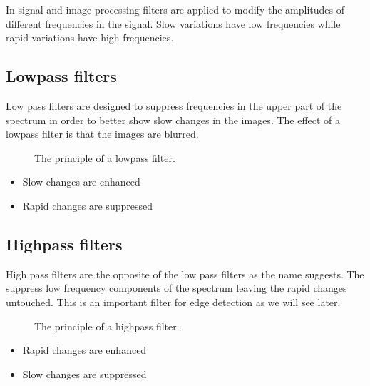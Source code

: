 \documentclass[letterpaper,10pt,english]{sphinxmanual}
\begin{document}
\sphinxAtStartPar
In signal and image processing filters are applied to modify the amplitudes of different frequencies in the signal. Slow variations have low frequencies while rapid variations have high frequencies.


\subsection{Low\sphinxhyphen{}pass filters}
\label{\detokenize{02-ImageEnhancement:low-pass-filters}}
\sphinxAtStartPar
Low pass filters are designed to suppress frequencies in the upper part of the spectrum in order to better show slow changes in the images. The effect of a lowpass filter is that the images are blurred.

\begin{figure}[htbp]
\centering
\capstart

\noindent{}
\caption{The principle of a low\sphinxhyphen{}pass filter.}\label{\detokenize{02-ImageEnhancement:id6}}\end{figure}
\begin{itemize}
\item {} 
\sphinxAtStartPar
Slow changes are enhanced

\item {} 
\sphinxAtStartPar
Rapid changes are suppressed

\end{itemize}




\subsection{High\sphinxhyphen{}pass filters}
\label{\detokenize{02-ImageEnhancement:high-pass-filters}}
\sphinxAtStartPar
High pass filters are the opposite of the low pass filters as the name suggests. The suppress low frequency components of the spectrum leaving the rapid changes untouched. This is an important filter for edge detection as we will see later.

\begin{figure}[htbp]
\centering
\capstart

\noindent{}
\caption{The principle of a high\sphinxhyphen{}pass filter.}\label{\detokenize{02-ImageEnhancement:id7}}\end{figure}
\begin{itemize}
\item {} 
\sphinxAtStartPar
Rapid changes are enhanced

\item {} 
\sphinxAtStartPar
Slow changes are suppressed

\end{itemize}
\end{document}
